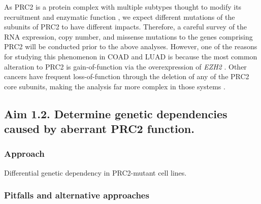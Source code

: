 As PRC2 is a protein complex with multiple subtypes thought to modify its recruitment and enzymatic function \cite{Wassef2017, Holoch2017, Kasinath2018, Laugesen2019a}, we expect different mutations of the subunits of PRC2 to have different impacts.
Therefore, a careful survey of the RNA expression, copy number, and missense mutations to the genes comprising PRC2 will be conducted prior to the above analyses.
However, one of the reasons for studying this phenomenon in COAD and LUAD is because the most common alteration to PRC2 is gain-of-function via the overexpression of \emph{EZH2} \cite{Comet2016MaintainingCancer.}.
Other cancers have frequent loss-of-function through the deletion of any of the PRC2 core subunits, making the analysis far more complex in those systems \cite{Comet2016MaintainingCancer.}.




\subsection*{Aim 1.2. Determine genetic dependencies caused by aberrant PRC2 function.}


\subsubsection*{Approach}

Differential genetic dependency in PRC2-mutant cell lines.


\subsubsection*{Pitfalls and alternative approaches}


